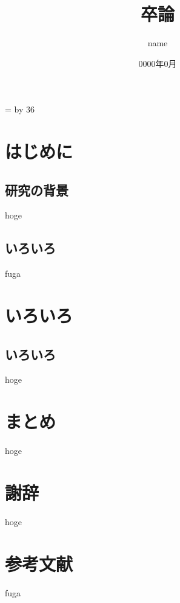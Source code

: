 \documentclass[10pt,a4paper]{jsarticle}
\title{卒論} %
\date{0000年0月} %
\author{name} %
\def\linesparpage#1{
    \baselineskip=\textheight
    \divide\baselineskip by #1
}
\begin{document}
\linesparpage{36} %

\begin{titlepage}
\maketitle
\thispagestyle{empty}
\end{titlepage}

\tableofcontents
\thispagestyle{empty}
\newpage

\setcounter{page}{1}
\pagestyle{plain}

\section{はじめに}
\subsection{研究の背景}
hoge
\subsection{いろいろ}
fuga

\section{いろいろ}
\subsection{いろいろ}
hoge

\section{まとめ}
hoge

\section*{謝辞}
hoge

\section*{参考文献}
fuga
\end{document}
